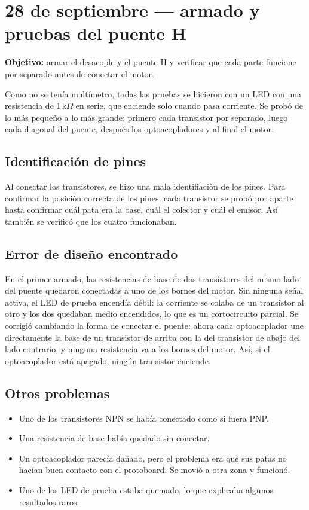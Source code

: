 \documentclass[10pt,conference]{IEEEtran}
\begin{document}
	\section{28 de septiembre --- armado y pruebas del puente H}
	\textbf{Objetivo:} armar el desacople y el puente H y verificar que cada parte funcione por
	separado antes de conectar el motor.
	
	Como no se ten\'ia mult\'imetro, todas las pruebas se hicieron con un LED con una resistencia de
	1\,k$\Omega$ en serie, que enciende solo cuando pasa corriente. Se prob\'o de lo m\'as peque\~no a
	lo m\'as grande: primero cada transistor por separado, luego cada diagonal del puente, despu\'es
	los optoacopladores y al final el motor.
	
	\subsection*{Identificaci\'on de pines}
	Al conectar los transistores, se hizo una mala identifiaci\`on de los pines. Para confirmar la posici\`on correcta de los pines, cada
	transistor se prob\'o por aparte hasta confirmar cu\'al pata era la base, cu\'al el colector y
	cu\'al el emisor. As\'i tambi\'en se verific\'o que los cuatro funcionaban.
	
	\subsection*{Error de dise\~no encontrado}
	En el primer armado, las resistencias de base de dos transistores del mismo lado del puente
	quedaron conectadas a uno de los bornes del motor. Sin ninguna se\~nal activa, el LED de prueba
	encend\'ia d\'ebil: la corriente se colaba de un transistor al otro y los dos quedaban medio
	encendidos, lo que es un cortocircuito parcial. Se corrigi\'o cambiando la forma de conectar el
	puente: ahora cada optoacoplador une directamente la base de un transistor de arriba con la del
	transistor de abajo del lado contrario, y ninguna resistencia va a los bornes del motor. As\'i,
	si el optoacoplador est\'a apagado, ning\'un transistor enciende.
	
	\subsection*{Otros problemas}
	\begin{itemize}
		\item Uno de los transistores NPN se hab\'ia conectado como si fuera PNP.
		\item Una resistencia de base hab\'ia quedado sin conectar.
		\item Un optoacoplador parec\'ia da\~nado, pero el problema era que sus patas no hac\'ian buen
		contacto con el protoboard. Se movi\'o a otra zona y funcion\'o.
		\item Uno de los LED de prueba estaba quemado, lo que explicaba algunos resultados raros.
	\end{itemize}
	
\end{document}
